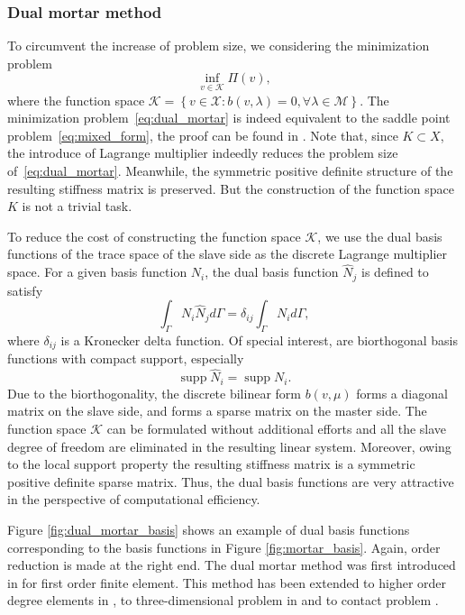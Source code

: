 \documentclass[preprint,12pt]{elsarticle}
\newcommand{\supp}{\mathop{\mathrm{supp}}}
\begin{document}
\subsubsection{Dual mortar method}
To circumvent the increase of problem size, we considering the minimization problem 
\begin{equation}
    \inf_{v\in{\mathcal{K}}}\Pi(v), \label{eq:dual_mortar}
\end{equation}
where the function space $\mathcal{K}=\left\{{v\in{\mathcal{X}}\colon{b(v,\lambda)=0, \forall\lambda\in{\mathcal{M}}}}\right\}$. The minimization problem~\eqref{eq:dual_mortar} is indeed equivalent to the saddle point problem~\eqref{eq:mixed_form}, the proof can be found in \cite{boffi_mixed_2013}. Note that, since $K\subset{X}$, the introduce of Lagrange multiplier indeedly reduces the problem size of~\eqref{eq:dual_mortar}. Meanwhile, the symmetric positive definite structure of the resulting stiffness matrix is preserved. But the construction of the function space $K$ is not a trivial task.\par
To reduce the cost of constructing the function space $\mathcal{K}$, we use the dual basis functions of the trace space of the slave side as the discrete Lagrange multiplier space. For a given basis function $N_i$, the dual basis function $\hat{N}_j$ is defined to satisfy
\begin{equation}
    \int_\Gamma{N_i\hat{N}_j}d\Gamma=\delta_{ij}\int_\Gamma{}N_id\Gamma,
\end{equation}
where $\delta_{ij}$ is a Kronecker delta function. Of special interest, are biorthogonal basis functions with compact support, especially
\begin{equation}
    \supp{\hat{N}_i}=\supp{{N}_i}.
\end{equation}
Due to the biorthogonality, the discrete bilinear form $b(v,\mu)$ forms a diagonal matrix on the slave side, and forms a sparse matrix on the master side. The function space $\mathcal{K}$ can be formulated without additional efforts and all the slave degree of freedom are eliminated in the resulting linear system. Moreover, owing to the local support property the resulting stiffness matrix is a symmetric positive definite sparse matrix. Thus, the dual basis functions are very attractive in the perspective of computational efficiency. 

Figure \ref{fig:dual_mortar_basis} shows an example of dual basis functions corresponding to the basis functions in Figure \ref{fig:mortar_basis}. Again, order reduction is made at the right end. The dual mortar method was first introduced in \cite{wohlmuth_mortar_2000} for first order finite element. This method has been extended to higher order degree elements in \cite{lamichhane2002higher}, to three-dimensional problem in \cite{wohlmuth2002comparison} and to contact problem \cite{hueber2005primal, popp2009finite}.\par
\end{document}
